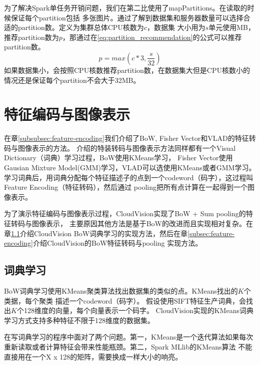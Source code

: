 为了解决Spark单任务开销问题，我们在第二比使用了mapPartitions。在读取的时候保证每个partition包括
多张图片。通过了解到数据集和服务器数量可以选择合适的partition数。定义为集群总体CPU核数为$c$，数据集
大小用为$s$单元使用MB，推荐partition数为$p$，那通过在\ref{eq:partition_recommendation}的公式可以推荐partition数。
\begin{equation} \label{eq:partition_recommendation}
p = max(c * 3, \frac{s}{32})
\end{equation}
如果数据集小，会按照CPU核数推荐partition数，在数据集大但是CPU核数小的情况还是保证每个partition不会大于32MB。



\section{特征编码与图像表示}
\label{sec:image-representation}
在章\ref{subsubsec:feature-encoding}我们介绍了BoW, Fisher Vector和VLAD的特征转码与图像表示的方法。
介绍的特装转码与图像表示方法同样都有一个Visual Dictionary（词典）学习过程，BoW使用KMeans学习，
Fisher Vector使用Gausian Mixture Model(GMM)学习，VLAD可以选使用KMeans或者GMM学习。
学习词典后，用词典分配每个特征描述子的点到一个codeword（码字），这过程叫Feature Encoding（特征转码），然后通过
pooling把所有点计算在一起得到一个图像表示。

为了演示特征编码与图像表示过程，CloudVision实现了BoW + Sum pooling的特征转码与图像表示，
主要原因其他方法是基于BoW的改进而且实现相对复杂。在章\ref{subsec:dict-learning}介绍CloudVision
BoW词典学习的实现方法，然后在章\ref{subsec:feature-encoding}介绍CloudVision的BoW特征转码与pooling
实现方法。

\subsection{词典学习}
\label{subsec:dict-learning}
BoW词典学习使用KMeans聚类算法找出数据集的类似的点。KMeans找出的$K$个类据，每个聚类
描述一个codeword（码字）。
假设使用SIFT特征生产词典，会找出$K$个128维度的向量，每个向量表示一个码字。
CloudVision实现的KMeans词典学习方式支持多种特征不限于128维度的数据集。

在写词典学习的程序中面对了两个问题。第一，KMeans是一个迭代算法如果每次
重新读取或者计算特征会带来性能瓶颈。第二，Spark MLlib的KMeans算法
不能直接用在一个X x 128的矩阵，需要换成一样大小的响亮。

